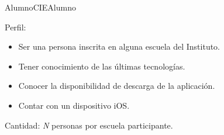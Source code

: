 \begin{actor}{Alumno}{CIEAlumno}
\begin{itemize}
			
%
%
		\end{itemize}


	\item[Perfil:] \hspace{1pt}
		\begin{itemize}
		    \item Ser una persona inscrita en alguna escuela del Instituto.
		    \item Tener conocimiento de las últimas tecnologías.
		    \item Conocer la disponibilidad de descarga de la aplicación.
		    \item Contar con un dispositivo iOS.
	    \end{itemize}

	\item[Cantidad:] \textit{N} personas por escuela participante.

\end{actor}

